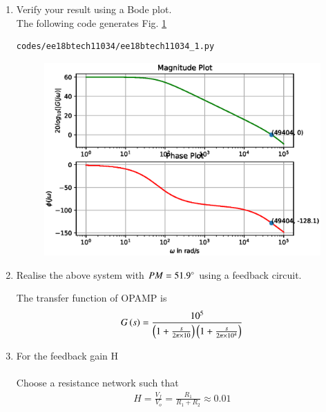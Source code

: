 \begin{enumerate}[label=\arabic*.,ref=\theenumi]
\item Verify your result using a Bode plot.
\\
\solution  The following code  generates Fig. \ref{fig:ee18btech11034_1}

\begin{lstlisting}
codes/ee18btech11034/ee18btech11034_1.py
\end{lstlisting}
%
\begin{figure}[!h]
\centering
\includegraphics[width=\columnwidth]{./figs/ee18btech11034/ee18btech11034_1.eps}
\caption{}
\label{fig:ee18btech11034_1}
\end{figure}
%

\item Realise the above system with $PM = 51.9 \degree$ using a feedback circuit.\\
\solution
\begin{figure}[ht!]
	\begin{center}
		\resizebox{\columnwidth/1}{!}{}
	\end{center}
	\caption{}
	\label{fig:ee18btech11034_figa}
\end{figure}

The transfer function of OPAMP is
\begin{align}
    G\left(s\right) = \frac{10^{5}}{\left(1+\frac{s}{2\pi \times 10}\right)\left(1+\frac{s}{2\pi \times 10^{4}}\right)}
\end{align}
%
\item For the feedback gain H\\
\solution\\
Choose a resistance network such that
\begin{align}
    H = \frac{V_{f}}{V_{o}} = \frac{R_{1}}{R_{1}+R_{2}} \approx 0.01
\end{align}
\begin{figure}[ht!]
	\begin{center}
		\resizebox{\columnwidth}{!}{}
	\end{center}
	\caption{}
	\label{fig:ee18btech11034_figb}
\end{figure}


\end{enumerate}
